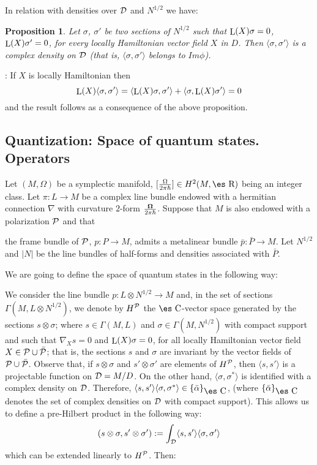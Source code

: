\documentclass[12pt]{article}
\theoremstyle{plain}
\newtheorem{prop}{Proposition}
\def\beq{\begin{equation}}
\def\eeq{\end{equation}}
\def\qed{\ifvmode\removelastskip\fi
{\unskip\nobreak\hfil\penalty50\hbox{}\nobreak\hfil
\hbox{\vrule height1.2ex width1.2ex}\parfillskip=0pt
\finalhyphendemerits=0 \par\smallskip}}
\def\Real{\mbox{\es R}}
\def\Complex{\mbox{\es C}}
\def\Lie{\mathop{\rm L}\nolimits}
\begin{document}
In relation with densities over ${\cal D}$ and $N^{1/2}$ we have:

\begin{prop}
Let $\sigma$, $\sigma '$ be two sections of $N^{1/2}$
such that $\Lie(X)\sigma = 0$, $\Lie(X)\sigma ' = 0$,
for every locally Hamiltonian vector field $X$ in $D$.
Then $\langle \sigma ,\sigma ' \rangle$ is a complex density on ${\cal
D}$
(that is, $\langle \sigma ,\sigma ' \rangle$ belongs to $Im \phi$).
\end{prop}%
: 
If $X$ is locally Hamiltonian then
$$
\Lie(X)\langle \sigma ,\sigma ' \rangle =
\langle \Lie(X)\sigma ,\sigma ' \rangle +
\langle \sigma ,\Lie(X)\sigma ' \rangle = 0
$$
and the result follows as a consequence of the above proposition.
\qed




\subsection{Quantization: Space of quantum states. Operators}


Let $(M,\Omega )$ be a symplectic manifold,
$[\frac{\Omega}{2\pi\hbar}] \in H^2(M,\Real )$ being an integer class.
Let $\pi \colon L \to M$ be a complex line bundle endowed with a
hermitian connection $\nabla$ with curvature $2$-form
$\frac{{\bf \Omega}}{2\pi\hbar}$.
Suppose that $M$ is also endowed with a polarization ${\cal P}$ and that

the
frame bundle of ${\cal P}$, $p \colon P \to M$,
admits a metalinear bundle $\bar p \colon \bar P \to M$.
Let $N^{1/2}$ and $|N|$ be the line bundles of half-forms and densities
associated with $\bar P$.

We are going to define the space of quantum states in the following way:

We consider the line bundle $p \colon L \otimes N^{1/2} \to M$
and, in the set of sections $\Gamma (M,L \otimes N^{1/2})$, we
denote by $H^{\cal P}$ the $\Complex$-vector space generated by
the sections $s \otimes \sigma$; where $s \in \Gamma (M,L)$ and
$\sigma \in \Gamma (M,N^{1/2})$ with compact support and such that
$\nabla_Xs = 0$ and $\Lie(X)\sigma = 0$, for all locally
Hamiltonian vector field $X \in {\cal P} \cup \bar {\cal P}$; that
is, the sections $s$ and $\sigma$ are invariant by the vector
fields of ${\cal P} \cup \bar {\cal P}$. Observe that, if $s
\otimes \sigma$ and $s' \otimes \sigma '$ are elements of $H^{\cal
P}$, then $\langle s,s' \rangle$ is a projectable function on
${\cal D} = M/D$. On the other hand, $\langle \sigma ,\sigma^*
\rangle$ is identified with a complex density on ${\cal D}$.
Therefore, $\langle s,s' \rangle \langle \sigma ,\sigma^* \rangle
\in \{ \bar \alpha \}_{\Complex}$, (where  $\{ \bar \alpha
\}_{\Complex}$ denotes the set of complex densities on ${\cal D}$
with compact support). This allows us to define a pre-Hilbert
product in the following way: \beq (s \otimes \sigma ,s' \otimes
\sigma ') := \int_{{\cal D}} \langle s,s' \rangle \langle \sigma
,\sigma ' \rangle \label{herprod} \eeq which can be extended
linearly to $H^{\cal P}$. Then:
\end{document}
